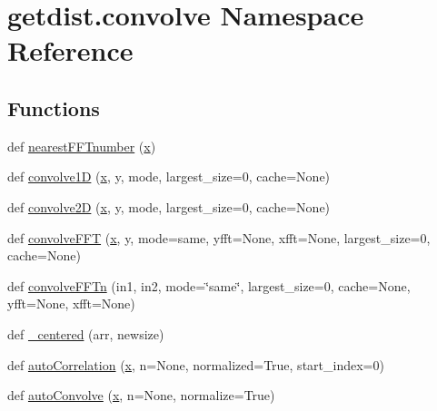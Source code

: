 \hypertarget{namespacegetdist_1_1convolve}{}\section{getdist.\+convolve Namespace Reference}
\label{namespacegetdist_1_1convolve}
\subsection*{Functions}
\begin{DoxyCompactItemize}
\item 
def \mbox{\hyperlink{namespacegetdist_1_1convolve_a72c0a4c9c2b191a6df8a1b6d327545b7}{nearest\+F\+F\+Tnumber}} (\mbox{\hyperlink{plotTT_8m_a9336ebf25087d91c818ee6e9ec29f8c1}{x}})
\item 
def \mbox{\hyperlink{namespacegetdist_1_1convolve_afcf448b1f8993227af712ca2b0c8399c}{convolve1D}} (\mbox{\hyperlink{plotTT_8m_a9336ebf25087d91c818ee6e9ec29f8c1}{x}}, y, mode, largest\+\_\+size=0, cache=None)
\item 
def \mbox{\hyperlink{namespacegetdist_1_1convolve_a519469039fd4ef30511d804e47fe8f41}{convolve2D}} (\mbox{\hyperlink{plotTT_8m_a9336ebf25087d91c818ee6e9ec29f8c1}{x}}, y, mode, largest\+\_\+size=0, cache=None)
\item 
def \mbox{\hyperlink{namespacegetdist_1_1convolve_af08ac2f6f2680fe66589162631d5d9ba}{convolve\+F\+FT}} (\mbox{\hyperlink{plotTT_8m_a9336ebf25087d91c818ee6e9ec29f8c1}{x}}, y, mode=\textquotesingle{}same\textquotesingle{}, yfft=None, xfft=None, largest\+\_\+size=0, cache=None)
\item 
def \mbox{\hyperlink{namespacegetdist_1_1convolve_a72fc3a89b0f824b66fc4e547a0783bdc}{convolve\+F\+F\+Tn}} (in1, in2, mode=\char`\"{}same\char`\"{}, largest\+\_\+size=0, cache=None, yfft=None, xfft=None)
\item 
def \mbox{\hyperlink{namespacegetdist_1_1convolve_adf879b81d1cce2e9098c8feca4b9d85b}{\+\_\+centered}} (arr, newsize)
\item 
def \mbox{\hyperlink{namespacegetdist_1_1convolve_ae675446f66ae37d976900cf3844eb726}{auto\+Correlation}} (\mbox{\hyperlink{plotTT_8m_a9336ebf25087d91c818ee6e9ec29f8c1}{x}}, n=None, normalized=True, start\+\_\+index=0)
\item 
def \mbox{\hyperlink{namespacegetdist_1_1convolve_af6628a68c41ddfddec7944d891a31800}{auto\+Convolve}} (\mbox{\hyperlink{plotTT_8m_a9336ebf25087d91c818ee6e9ec29f8c1}{x}}, n=None, normalize=True)
\item 

\end{DoxyCompactItemize}
